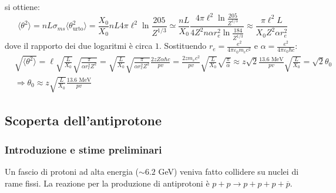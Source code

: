 \documentclass[10pt, a4paper]{scrartcl}
\numberwithin{equation}{subsection}
\theoremstyle{style1}
\begin{document}
si ottiene:
\[
	\langle \theta ^2 \rangle = nL\sigma _{ms} \langle \theta _{\text{urto}} ^2 \rangle = \frac{X_0}{X_0}n L 4 \pi \ell ^2 \ln \frac{205}{Z^{1 / 3} } \simeq \frac{nL}{X_0} \frac{4\pi \ell ^2 \ln \frac{205}{Z^{1 / 3} }}{4Z^2 n \alpha  r_e^2 \ln \frac{184}{Z^{1 / 3} }}\approx \frac{\pi \ell ^2 L}{X_0Z^2 \alpha r_e^2}
\] 
dove il rapporto dei due logaritmi \`e circa $1$. Sostituendo $r_e = \frac{e^2}{4\pi \varepsilon _0 m_e c^2}$ e $\alpha = \frac{e^2}{4\pi \varepsilon _0 \hbar  c}$:
\[
\begin{split}
	&\sqrt{\langle \theta ^2 \rangle} = \ell  \sqrt{\frac{L}{X_0}} \sqrt{\frac{\pi}{\alpha r_e^2 Z^2}} = \sqrt{\frac{L}{X_0}} \sqrt{\frac{\pi}{\alpha r_e^2 Z^2}} \frac{2zZ \alpha  \hbar  c}{pv}= \frac{2z m_e c^2}{pv} \sqrt{\frac{L}{X_0}}  \sqrt{\frac{\pi}{\alpha }}\approx z \sqrt{2} \frac{13.6 \text{ MeV}}{pv} \sqrt{\frac{L}{X_0}}  = \sqrt{2} \theta _0\\
	&\Rightarrow \theta _0 \approx z \sqrt{\frac{L}{X_0}} \frac{13.6 \text{ MeV}}{pv}
\end{split}
\] 

\subsection{Scoperta dell'antiprotone}
\subsubsection{Introduzione e stime preliminari}


Un fascio di protoni ad alta energia ($\sim 6.2$ GeV) veniva fatto collidere su nuclei di rame fissi. La reazione per la produzione di antiprotoni \`e $p + p \to p+p+ p + \overline{p}$.
\end{document}
